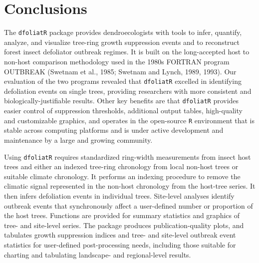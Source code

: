 \documentclass[review]{elsarticle} %
\newenvironment{Shaded}{\begin{snugshade}}{\end{snugshade}}
\newcommand{\CommentTok}[1]{\textcolor[rgb]{0.56,0.35,0.01}{\textit{#1}}}
\newcommand{\KeywordTok}[1]{\textcolor[rgb]{0.13,0.29,0.53}{\textbf{#1}}}
\newcommand{\NormalTok}[1]{#1}
\newcommand{\OperatorTok}[1]{\textcolor[rgb]{0.81,0.36,0.00}{\textbf{#1}}}
\newcommand{\StringTok}[1]{\textcolor[rgb]{0.31,0.60,0.02}{#1}}
\begin{document}
\begin{Shaded}
\end{Shaded}

\hypertarget{conclusions}{%
\section{Conclusions}\label{conclusions}}

The \texttt{dfoliatR} package provides dendroecologists with tools to infer, quantify, analyze, and visualize tree-ring growth suppression events and to reconstruct forest insect defoliator outbreak regimes. It is built on the long-accepted host to non-host comparison methodology used in the 1980s FORTRAN program OUTBREAK (Swetnam et al., 1985; Swetnam and Lynch, 1989, 1993). Our evaluation of the two programs revealed that \texttt{dfoliatR} excelled in identifying defoliation events on single trees, providing researchers with more consistent and biologically-justifiable results. Other key benefits are that \texttt{dfoliatR} provides easier control of suppression thresholds, additional output tables, high-quality and customizable graphics, and operates in the open-source \texttt{R} environment that is stable across computing platforms and is under active development and maintenance by a large and growing community.

Using \texttt{dfoliatR} requires standardized ring-width measurements from insect host trees and either an indexed tree-ring chronology from local non-host trees or suitable climate chronology. It performs an indexing procedure to remove the climatic signal represented in the non-host chronology from the host-tree series. It then infers defoliation events in individual trees. Site-level analyses identify outbreak events that synchronously affect a user-defined number or proportion of the host trees. Functions are provided for summary statistics and graphics of tree- and site-level series. The package produces publication-quality plots, and tabulates growth suppression indices and tree- and site-level outbreak event statistics for user-defined post-processing needs, including those suitable for charting and tabulating landscape- and regional-level results.
\end{document}
